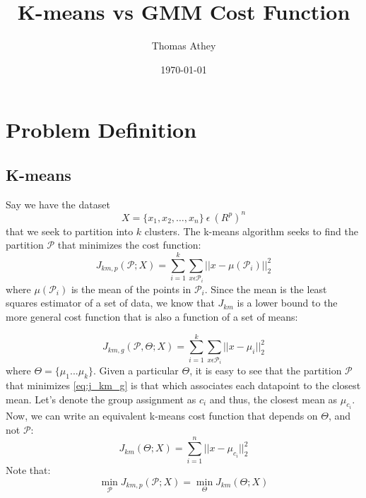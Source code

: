 \documentclass{article}
\title{K-means vs GMM Cost Function}
\author{Thomas Athey}
\date\today
\begin{document}
\maketitle
\section{Problem Definition}
\subsection{K-means}
Say we have the dataset \[ X=\{x_1,x_2,\ldots,x_n\} \: \epsilon \: (R^p)^n \] that we seek to partition into $k$ clusters. The k-means algorithm seeks to find the partition $\mathscr{P}$ that minimizes the cost function:
\begin{equation}
\label{eq:j_km1}
J_{km,p}(\mathscr{P};X) =  \sum\limits_{i=1}^k  \sum\limits_{x \epsilon \mathscr{P}_i} || x - \mu(\mathscr{P}_i)||_2^2
\end{equation}
where $\mu(\mathscr{P}_i)$ is the mean of the points in $\mathscr{P}_i$. Since the mean is the least squares estimator of a set of data, we know that $J_{km}$ is a lower bound to the more general cost function that is also a function of a set of means:

\begin{equation}
\label{eq:j_km_g}
 J_{km,g}(\mathscr{P},\Theta;X)=  \sum\limits_{i=1}^k  \sum\limits_{x \epsilon \mathscr{P}_i} || x - \mu_i||_2^2
\end{equation}
\noindent
where $\Theta=\{\mu_1...\mu_k\}$. Given a particular $\Theta$, it is easy to see that the partition $\mathscr{P}$ that minimizes \eqref{eq:j_km_g} is that which associates each datapoint to the closest mean. Let's denote the group assignment as $c_i$ and thus, the closest mean as $\mu_{c_i}$. Now, we can write an equivalent k-means cost function that depends on $\Theta$, and not $\mathscr{P}$:
\begin{equation}
\label{eq:j_km}
J_{km}(\Theta;X) =  \sum\limits_{i=1}^n  || x - \mu_{c_i}||_2^2
\end{equation}
Note that:
\[ \min_{\mathscr{P}} J_{km,p}(\mathscr{P};X) = \min_{\Theta} J_{km}(\Theta;X) \]
\end{document}
